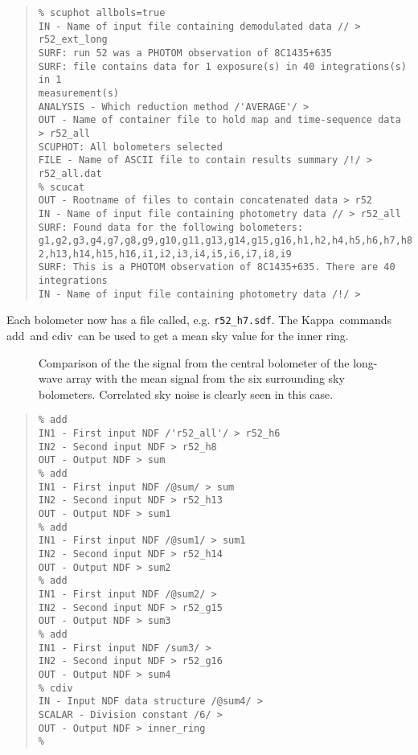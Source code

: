 \documentclass[twoside,11pt,fleqn]{article}
\newenvironment{myquote}{\begin{quote}\begin{small}}{\end{small}\end{quote}}
\newcommand{\Kappa}{\xref{{\sc Kappa}}{sun95}{}}
\newcommand{\task}[1]{{\sf #1}}
\newcommand{\cdiv}{\xref{\task{cdiv}}{sun95}{CDIV}}
\newcommand{\add}{\xref{\task{add}}{sun95}{ADD}}
\newcommand{\xref}[3]{#1}
\begin{document}
\begin{myquote}
\begin{verbatim}
% scuphot allbols=true
IN - Name of input file containing demodulated data // > r52_ext_long
SURF: run 52 was a PHOTOM observation of 8C1435+635
SURF: file contains data for 1 exposure(s) in 40 integrations(s) in 1
measurement(s)
ANALYSIS - Which reduction method /'AVERAGE'/ > 
OUT - Name of container file to hold map and time-sequence data > r52_all
SCUPHOT: All bolometers selected
FILE - Name of ASCII file to contain results summary /!/ > r52_all.dat
% scucat
OUT - Rootname of files to contain concatenated data > r52
IN - Name of input file containing photometry data // > r52_all
SURF: Found data for the following bolometers:
g1,g2,g3,g4,g7,g8,g9,g10,g11,g13,g14,g15,g16,h1,h2,h4,h5,h6,h7,h8,h9,h10,h11,h1
2,h13,h14,h15,h16,i1,i2,i3,i4,i5,i6,i7,i8,i9
SURF: This is a PHOTOM observation of 8C1435+635. There are 40 integrations
IN - Name of input file containing photometry data /!/ > 
\end{verbatim}
\end{myquote}

Each bolometer now has a file called, e.g. {\tt r52\_h7.sdf}. The
\Kappa\ commands \add\ and \cdiv\ can be used to get a
mean sky value for the inner ring.

\begin{figure}
\caption{Comparison of the the signal from the central bolometer of
the long-wave array with the mean signal from the six surrounding sky
bolometers. Correlated sky noise is clearly seen in this case.}
\label{f3}
\end{figure}

\begin{myquote}
\begin{verbatim}
% add
IN1 - First input NDF /'r52_all'/ > r52_h6
IN2 - Second input NDF > r52_h8
OUT - Output NDF > sum
% add
IN1 - First input NDF /@sum/ > sum
IN2 - Second input NDF > r52_h13
OUT - Output NDF > sum1
% add
IN1 - First input NDF /@sum1/ > sum1
IN2 - Second input NDF > r52_h14
OUT - Output NDF > sum2
% add
IN1 - First input NDF /@sum2/ > 
IN2 - Second input NDF > r52_g15
OUT - Output NDF > sum3
% add
IN1 - First input NDF /sum3/ >
IN2 - Second input NDF > r52_g16
OUT - Output NDF > sum4
% cdiv
IN - Input NDF data structure /@sum4/ > 
SCALAR - Division constant /6/ > 
OUT - Output NDF > inner_ring
% 
\end{verbatim}
\end{myquote}
\end{document}
